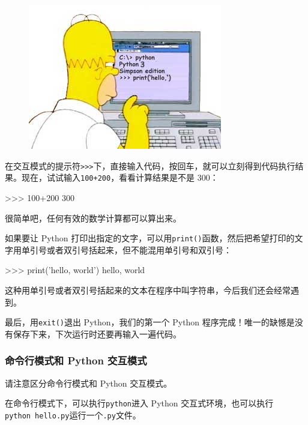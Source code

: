  
 \begin{figure}[htp]
	\centering
	\includegraphics[width=0.6\linewidth]{fig/1017024373322432l.png}
\end{figure}


在交互模式的提示符\texttt{\textgreater{}\textgreater{}\textgreater{}}下，直接输入代码，按回车，就可以立刻得到代码执行结果。现在，试试输入\texttt{100+200}，看看计算结果是不是
300：

\begin{pythoncode}
>>> 100+200
300
\end{pythoncode}

很简单吧，任何有效的数学计算都可以算出来。

如果要让 Python
打印出指定的文字，可以用\texttt{print()}函数，然后把希望打印的文字用单引号或者双引号括起来，但不能混用单引号和双引号：

\begin{pythoncode}
>>> print('hello, world')
hello, world
\end{pythoncode}

这种用单引号或者双引号括起来的文本在程序中叫字符串，今后我们还会经常遇到。

最后，用\texttt{exit()}退出 Python，我们的第一个 Python
程序完成！唯一的缺憾是没有保存下来，下次运行时还要再输入一遍代码。

\hypertarget{ux547dux4ee4ux884cux6a21ux5f0fux548c-python-ux4ea4ux4e92ux6a21ux5f0f}{%
\subsubsection{命令行模式和 Python
交互模式}\label{ux547dux4ee4ux884cux6a21ux5f0fux548c-python-ux4ea4ux4e92ux6a21ux5f0f}}

请注意区分命令行模式和 Python 交互模式。

在命令行模式下，可以执行\texttt{python}进入 Python
交互式环境，也可以执行\texttt{python\ hello.py}运行一个\texttt{.py}文件。

